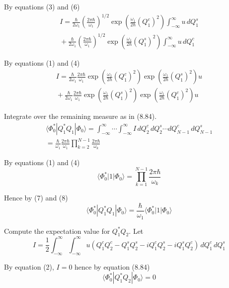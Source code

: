 \documentclass[12pt]{article}
\begin{document}
By equations (3) and (6)
\begin{multline*}
I=
\frac{\hbar}{2\omega_1}\left(\frac{2\pi\hbar}{\omega_1}\right)^{1/2}
\exp\left(\frac{\omega_1}{2\hbar}(Q_1^c)^2\right)
\int_{-\infty}^\infty u\,dQ_1^s
\\
{}+\frac{\hbar}{2\omega_1}\left(\frac{2\pi\hbar}{\omega_1}\right)^{1/2}
\exp\left(\frac{\omega_1}{2\hbar}(Q_1^s)^2\right)
\int_{-\infty}^\infty u\,dQ_1^c
\end{multline*}

By equations (1) and (4)
\begin{multline*}
I=
\frac{\hbar}{2\omega_1}
\frac{2\pi\hbar}{\omega_1}
\exp\left(\frac{\omega_1}{2\hbar}(Q_1^c)^2\right)
\exp\left(\frac{\omega_1}{2\hbar}(Q_1^s)^2\right)
u
\\
{}+
\frac{\hbar}{2\omega_1}
\frac{2\pi\hbar}{\omega_1}
\exp\left(\frac{\omega_1}{2\hbar}(Q_1^s)^2\right)
\exp\left(\frac{\omega_1}{2\hbar}(Q_1^c)^2\right)
u
\end{multline*}

Integrate over the remaining measure as in (8.84).
\begin{multline*}
\langle\Phi_0^*|Q_1^*Q_1|\Phi_0\rangle
=\int_{-\infty}^\infty\cdots\int_{-\infty}^\infty I\,dQ_2^c\,dQ_2^s\cdots dQ_{N-1}^c\,dQ_{N-1}^s
\\
=\frac{\hbar}{\omega_1}
\frac{2\pi\hbar}{\omega_1}
\prod_{k=2}^{N-1}\frac{2\pi\hbar}{\omega_k}
\tag{7}
\end{multline*}

By equations (1) and (4)
\begin{equation*}
\langle\Phi_0^*|1|\Phi_0\rangle
=\prod_{k=1}^{N-1}\frac{2\pi\hbar}{\omega_k}
\tag{8}
\end{equation*}

Hence by (7) and (8)
\begin{equation*}
\langle\Phi_0^*|Q_1^*Q_1|\Phi_0\rangle=\frac{\hbar}{\omega_1}\langle\Phi_0^*|1|\Phi_0\rangle
\end{equation*}

Compute the expectation value for $Q_1^*Q_2$.
Let
\begin{equation*}
I=\frac{1}{2}\int_{-\infty}^\infty\int_{-\infty}^\infty
u\left(Q_1^cQ_2^c-Q_1^sQ_2^s-iQ_1^cQ_2^s-iQ_1^sQ_2^c\right)
\,dQ_1^c\,dQ_1^s
\end{equation*}

By equation (2), $I=0$ hence by equation (8.84)
\begin{equation*}
\langle\Phi_0^*|Q_1^*Q_2|\Phi_0\rangle=0
\end{equation*}
\end{document}
